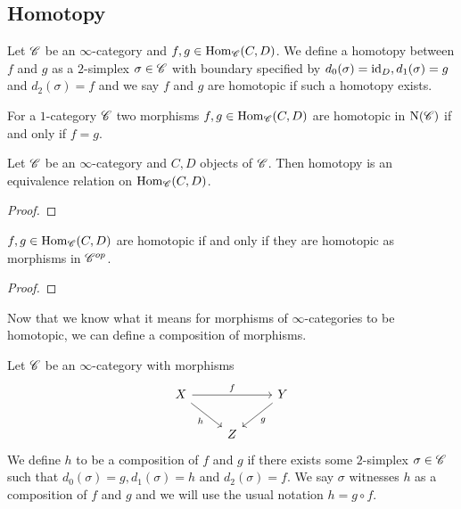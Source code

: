 \documentclass[../thesis.tex]{subfiles}
\begin{document}
\subsection{Homotopy}
\begin{definition}
    Let $\mathscr{C}$ be an $\infty$-category and $f,g \in \mathrm{Hom}_{\mathscr{C}}(C,D)$.
    We define a homotopy between $f$ and $g$ as a $2$-simplex $\sigma \in \mathscr{C}$ with boundary specified by $d_0(\sigma) = \operatorname{id}_D, d_1(\sigma) = g$ and $d_2(\sigma)=f$ and we say $f$ and $g$ are homotopic if such a homotopy exists.
\end{definition}
\begin{example}
    For a $1$-category $\mathscr{C}$ two morphisms $f,g \in \mathrm{Hom}_{\mathscr{C}}(C,D)$ are homotopic in $\mathrm{N}(\mathscr{C})$ if and only if $f=g$.
\end{example}
\begin{proposition}
    Let $\mathscr{C}$ be an $\infty$-category and $C,D$ objects of $\mathscr{C}$.
    Then homotopy is an equivalence relation on $\mathrm{Hom}_{\mathscr{C}}(C,D)$.
\end{proposition}
\begin{proof}
\end{proof}
\begin{proposition}
    $f,g \in \mathrm{Hom}_{\mathscr{C}}(C,D)$ are homotopic if and only if they are homotopic as morphisms in $\mathscr{C}^{op}$.
\end{proposition}
\begin{proof}
\end{proof}
Now that we know what it means for morphisms of $\infty$-categories to be homotopic, we can define a composition of morphisms.
\begin{definition}
    Let $\mathscr{C}$ be an $\infty$-category with morphisms
    \[\begin{tikzcd}
            X && Y \\
            & Z
            \arrow["f", from=1-1, to=1-3]
            \arrow["g", from=1-3, to=2-2]
            \arrow["h"', from=1-1, to=2-2]
        \end{tikzcd}\]
    We define $h$ to be a composition of $f$ and $g$ if there exists some $2$-simplex $\sigma \in \mathscr{C}$ such that $d_0(\sigma) = g, d_1(\sigma)=h$ and $d_2(\sigma)=f$.
    We say $\sigma$ witnesses $h$ as a composition of $f$ and $g$ and we will use the usual notation $h = g \circ f$.
\end{definition}
\end{document}
